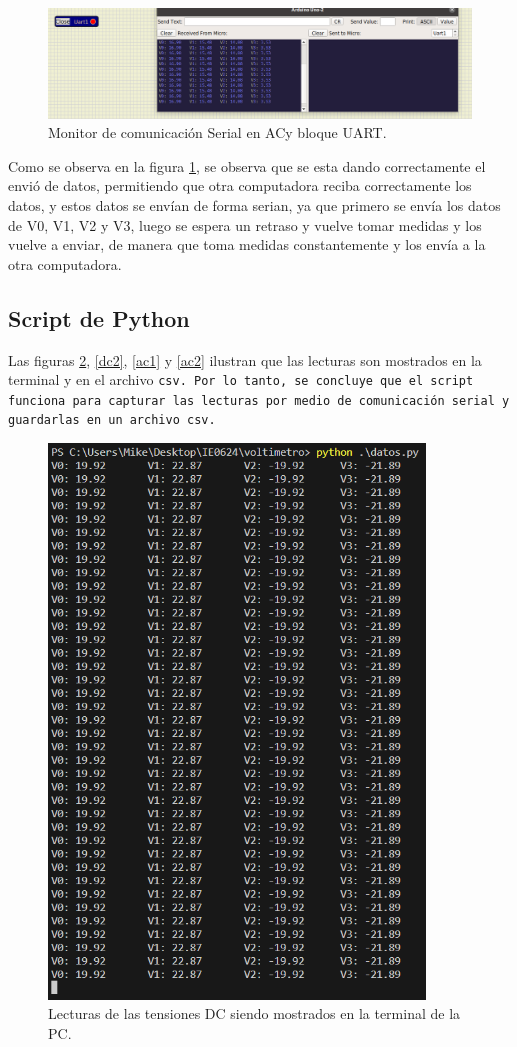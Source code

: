 \begin{figure}[H]
    \centering
    \includegraphics[width=\textwidth]{Imagenes/Comunicacion_Seria_AC.png}
    \caption{Monitor de comunicación Serial en ACy bloque UART.}
    \label{monitor_AC}
\end{figure}

Como se observa en la figura \ref{monitor_AC}, se observa que se esta dando correctamente el envió de datos, permitiendo que otra computadora reciba correctamente los datos, y estos datos se envían de forma serian, ya que primero se envía los datos de V0, V1, V2 y V3, luego se espera un retraso y vuelve tomar medidas y los vuelve a enviar, de manera que toma medidas constantemente y los envía a la otra computadora.

\subsection{Script de Python}
Las figuras \ref{dc1}, \ref{dc2}, \ref{ac1} y \ref{ac2} ilustran que las lecturas son mostrados en la terminal y en el archivo \tt{csv}. Por lo tanto, se concluye que el script funciona para capturar las lecturas por medio de comunicación serial y guardarlas en un archivo csv.
\begin{figure}
    \centering
    \includegraphics[width=10cm]{Imagenes/DC-save.png}
    \caption{Lecturas de las tensiones DC siendo mostrados en la terminal de la PC.}
    \label{dc1}
\end{figure}

